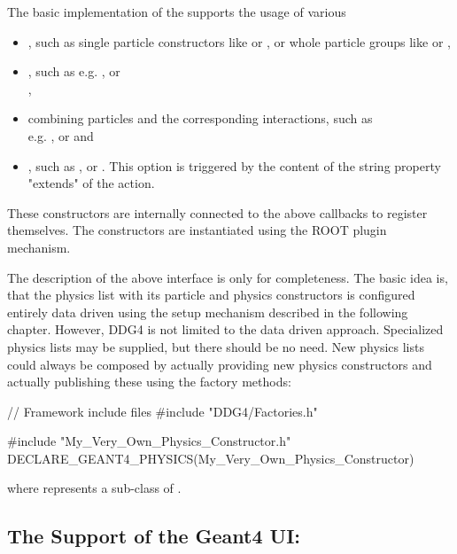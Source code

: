 \documentclass[10pt,a4paper]{article}
\begin{document}
\noindent
The basic implementation of the  supports the usage of various
\begin{itemize}\itemcompact
\item {}, such as single particle constructors like   
     or , or whole particle groups like
     or ,
\item {}, such as e.g. ,
     or\\ , 
\item {} combining particles and the corresponding 
    interactions, such as\\ e.g. ,
     or  and
\item {}, such as ,
     or . This option is triggered by the 
    content of the string property "extends" of the  action.
\end{itemize}
These constructors are internally connected to the above callbacks to register themselves. 
The constructors are instantiated using the ROOT plugin mechanism.

\noindent
The description of the above interface is only for completeness. The basic idea is,
that the physics list with its particle and physics constructors is configured
entirely data driven using the setup mechanism described in the following
chapter. However, DDG4 is not limited to the data driven approach. Specialized 
physics lists may be supplied, but there should be no need.
New physics lists could always be composed by actually providing new physics
constructors and actually publishing these using the factory methods:
\begin{code}
// Framework include files
#include "DDG4/Factories.h"

#include "My_Very_Own_Physics_Constructor.h"
DECLARE_GEANT4_PHYSICS(My_Very_Own_Physics_Constructor)
\end{code}
where  represents a sub-class of
.

\newpage
\subsection{The Support of the Geant4 UI: }
\label{sec:ddg4-user-manual-geant4action-base}
\end{document}
